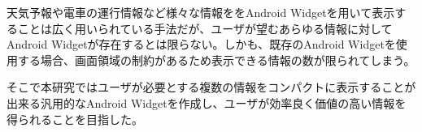 
\begin{jabstract}
天気予報や電車の運行情報など様々な情報ををAndroid Widgetを用いて表示することは広く用いられている手法だが、ユーザが望むあらゆる情報に対してAndroid Widgetが存在するとは限らない。しかも、既存のAndroid Widgetを使用する場合、画面領域の制約があるため表示できる情報の数が限られてしまう。

そこで本研究ではユーザが必要とする複数の情報をコンパクトに表示することが出来る汎用的なAndroid Widgetを作成し、ユーザが効率良く価値の高い情報を得られることを目指した。

\end{jabstract}
